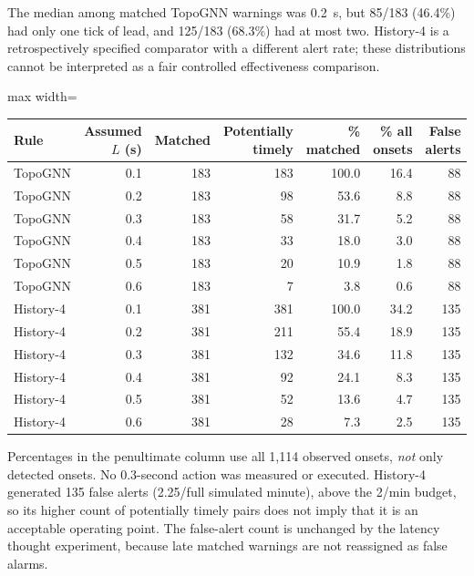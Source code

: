 \documentclass[10pt,a4paper]{article}
\begin{document}
\noindent The median among matched TopoGNN warnings was 0.2~s, but 85/183 (46.4\%) had only one tick of lead, and 125/183 (68.3\%) had at most two. History-4 is a retrospectively specified comparator with a different alert rate; these distributions cannot be interpreted as a fair controlled effectiveness comparison.

\begin{center}
\small
\setlength{\tabcolsep}{5pt}
\begin{adjustbox}{max width=\linewidth}\begin{tabular}{lrrrrrr}
\toprule
Rule & Assumed $L$ (s) & Matched & Potentially timely & \% matched & \% all onsets & False alerts \\
\midrule
TopoGNN & 0.1 & 183 & 183 & 100.0 & 16.4 & 88 \\
TopoGNN & 0.2 & 183 & 98 & 53.6 & 8.8 & 88 \\
TopoGNN & 0.3 & 183 & 58 & 31.7 & 5.2 & 88 \\
TopoGNN & 0.4 & 183 & 33 & 18.0 & 3.0 & 88 \\
TopoGNN & 0.5 & 183 & 20 & 10.9 & 1.8 & 88 \\
TopoGNN & 0.6 & 183 & 7 & 3.8 & 0.6 & 88 \\
History-4 & 0.1 & 381 & 381 & 100.0 & 34.2 & 135 \\
History-4 & 0.2 & 381 & 211 & 55.4 & 18.9 & 135 \\
History-4 & 0.3 & 381 & 132 & 34.6 & 11.8 & 135 \\
History-4 & 0.4 & 381 & 92 & 24.1 & 8.3 & 135 \\
History-4 & 0.5 & 381 & 52 & 13.6 & 4.7 & 135 \\
History-4 & 0.6 & 381 & 28 & 7.3 & 2.5 & 135 \\
\bottomrule
\end{tabular}\end{adjustbox}
\end{center}

\noindent Percentages in the penultimate column use all 1,114 observed onsets, \emph{not} only detected onsets. No 0.3-second action was measured or executed. History-4 generated 135 false alerts (2.25/full simulated minute), above the 2/min budget, so its higher count of potentially timely pairs does not imply that it is an acceptable operating point. The false-alert count is unchanged by the latency thought experiment, because late matched warnings are not reassigned as false alarms.
\end{document}
